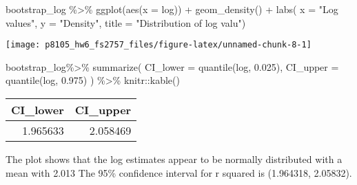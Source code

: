 \documentclass[
]{article}
\newenvironment{Shaded}{\begin{snugshade}}{\end{snugshade}}
\newcommand{\AttributeTok}[1]{\textcolor[rgb]{0.77,0.63,0.00}{#1}}
\newcommand{\FloatTok}[1]{\textcolor[rgb]{0.00,0.00,0.81}{#1}}
\newcommand{\FunctionTok}[1]{\textcolor[rgb]{0.00,0.00,0.00}{#1}}
\newcommand{\NormalTok}[1]{#1}
\newcommand{\SpecialCharTok}[1]{\textcolor[rgb]{0.00,0.00,0.00}{#1}}
\newcommand{\StringTok}[1]{\textcolor[rgb]{0.31,0.60,0.02}{#1}}
\begin{document}
\begin{Shaded}
\begin{Highlighting}[]
\NormalTok{bootstrap\_log }\SpecialCharTok{\%\textgreater{}\%} 
\FunctionTok{ggplot}\NormalTok{(}\FunctionTok{aes}\NormalTok{(}\AttributeTok{x =}\NormalTok{ log)) }\SpecialCharTok{+} 
  \FunctionTok{geom\_density}\NormalTok{() }\SpecialCharTok{+}
   \FunctionTok{labs}\NormalTok{(}
      \AttributeTok{x =} \StringTok{"Log values"}\NormalTok{,}
      \AttributeTok{y =} \StringTok{"Density"}\NormalTok{,}
      \AttributeTok{title =} \StringTok{"Distribution of log valu"}\NormalTok{)}
\end{Highlighting}
\end{Shaded}

\texttt{[image: p8105\_hw6\_fs2757\_files/figure-latex/unnamed-chunk-8-1]}

\begin{Shaded}
\begin{Highlighting}[]
\NormalTok{bootstrap\_log}\SpecialCharTok{\%\textgreater{}\%} 
  \FunctionTok{summarize}\NormalTok{(}
    \AttributeTok{CI\_lower =} \FunctionTok{quantile}\NormalTok{(log, }\FloatTok{0.025}\NormalTok{),}
    \AttributeTok{CI\_upper =} \FunctionTok{quantile}\NormalTok{(log, }\FloatTok{0.975}\NormalTok{)}
\NormalTok{  ) }\SpecialCharTok{\%\textgreater{}\%} 
\NormalTok{  knitr}\SpecialCharTok{::}\FunctionTok{kable}\NormalTok{()}
\end{Highlighting}
\end{Shaded}

\begin{longtable}[]{@{}rr@{}}
\toprule
CI\_lower & CI\_upper \\
\midrule
\endhead
1.965633 & 2.058469 \\
\bottomrule
\end{longtable}

The plot shows that the log estimates appear to be normally distributed
with a mean with 2.013 The 95\% confidence interval for r squared is
(1.964318, 2.05832).
\end{document}
